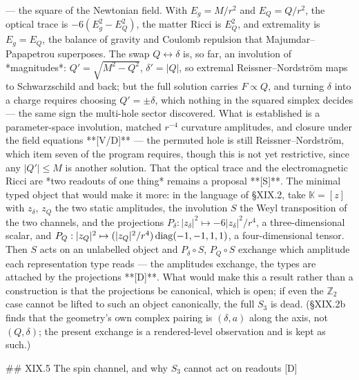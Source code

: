 — the square of the Newtonian field. With $E_g = M/r^2$ and $E_Q = Q/r^2$, the optical trace is $-6(E_g^2-E_Q^2)$, the matter Ricci is $E_Q^2$, and extremality is $E_g = E_Q$, the balance of gravity and Coulomb repulsion that Majumdar–Papapetrou superposes. The swap $Q\leftrightarrow\delta$ is, so far, an involution of *magnitudes*: $Q' = \sqrt{M^2-Q^2}$, $\delta' = |Q|$, so extremal Reissner–Nordström maps to Schwarzschild and back; but the full solution carries $F\propto Q$, and turning $\delta$ into a charge requires choosing $Q' = \pm\delta$, which nothing in the squared simplex decides — the same sign the multi-hole sector discovered. What is established is a parameter-space involution, matched $r^{-4}$ curvature amplitudes, and closure under the field equations **[V/D]** — the permuted hole is still Reissner–Nordström, which item seven of the program requires, though this is not yet restrictive, since any $|Q'|\leq M$ is another solution. That the optical trace and the electromagnetic Ricci are *two readouts of one thing* remains a proposal **[S]**. The minimal typed object that would make it more: in the language of §XIX.2, take $\mathbb K = [z]$ with $z_\delta$, $z_Q$ the two static amplitudes, the involution $S$ the Weyl transposition of the two channels, and the projections $P_\delta:|z_\delta|^2\mapsto-6|z_\delta|^2/r^4$, a three-dimensional scalar, and $P_Q:|z_Q|^2\mapsto(|z_Q|^2/r^4)\,{\rm diag}(-1,-1,1,1)$, a four-dimensional tensor. Then $S$ acts on an unlabelled object and $P_\delta\circ S$, $P_Q\circ S$ exchange which amplitude each representation type reads — the amplitudes exchange, the types are attached by the projections **[D]**. What would make this a result rather than a construction is that the projections be canonical, which is open; if even the $\mathbb Z_2$ case cannot be lifted to such an object canonically, the full $S_3$ is dead. (§XIX.2b finds that the geometry's own complex pairing is $(\delta,a)$ along the axis, not $(Q,\delta)$; the present exchange is a rendered-level observation and is kept as such.)

## XIX.5 The spin channel, and why $S_3$ cannot act on readouts [D]

